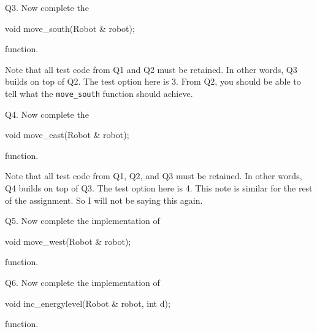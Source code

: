 \newpage
Q3.
Now complete the
{\small
\begin{console}
void move_south(Robot & robot);
\end{console}
}
function.

Note that all test code from Q1 and Q2 must be retained.
In other words, Q3 builds on top of Q2.
The test option here is 3.
From Q2, you should be able to tell what the
\verb!move_south! function should achieve.

\newpage
Q4.
Now complete the
{\small
\begin{console}
void move_east(Robot & robot);
\end{console}
}
function.

Note that all test code from Q1, Q2, and Q3 must be retained.
In other words, Q4 builds on top of Q3.
The test option here is 4.
This note is similar for the rest of the assignment.
So I will not be saying this again.


\newpage
Q5.
Now complete the implementation of
{\small
\begin{console}
void move_west(Robot & robot);
\end{console}
}
function.


\newpage
Q6.
Now complete the implementation of
{\small
\begin{console}
void inc_energylevel(Robot & robot, int d);
\end{console}
}
function.

